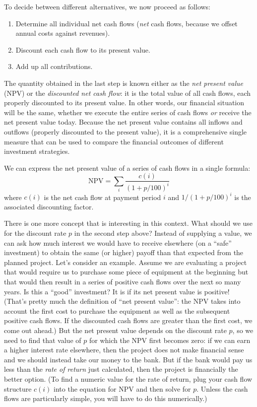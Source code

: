 To decide between different alternatives, we now proceed as follows:

\begin{enumerate}
\item Determine all individual net cash flows (\emph{net} cash flows, 
  because we offset annual costs against revenues).
\item Discount each cash flow to its present value.
\item Add up all contributions.
\end{enumerate}
 
The quantity obtained in the last step is known either as the
\emph{net present value} (NPV) or the \emph{discounted net cash flow}:
it is the total value of all cash flows, each properly discounted to
its present value. In other words, our financial situation will be the
same, whether we execute the entire series of cash flows \emph{or}
receive the net present value today.  Because the net present value
contains all inflows and outflows (properly discounted to the present
value), it is a comprehensive single measure that can be used to
compare the financial outcomes of different investment strategies.

We can express the net present value of a series of cash flows in a
single formula:
%
\[
\text{NPV} = \sum_i \frac{c(i)}{(1+p/100)^i}
\]
%
where $c(i)$ is the net cash flow at payment period $i$ and
$1/(1+p/100)^i$ is the associated discounting factor.


There is one more concept that is interesting in this context. What
should we use for the discount rate $p$ in the second step above?
Instead of supplying a value, we can ask how much interest we would
have to receive elsewhere (on a ``safe'' investment) to obtain the
same (or higher) payoff than that expected from the planned project.
Let's consider an example. Assume we are evaluating a project that
would require us to purchase some piece of equipment at the beginning
but that would then result in a series of positive cash flows over the
next so many years.  Is this a ``good'' investment? It is if its net
present value is positive! (That's pretty much the definition of ``net
present value'': the NPV takes into account the first cost to purchase
the equipment as well as the subsequent positive cash flows. If the
discounted cash flows are greater than the first cost, we come out
ahead.) But the net present value depends on the discount rate $p$, so
we need to find that value of $p$ for which the NPV first becomes
zero: if we can earn a higher interest rate elsewhere, then the
project does not make financial sense and we should instead take our
money to the bank. But if the bank would pay us less than the
\emph{rate of return} just calculated, then the project is financially
the better option. (To find a numeric value for the rate of return,
plug your cash flow structure $c(i)$ into the equation for NPV and
then solve for $p$. Unless the cash flows are particularly simple, you
will have to do this numerically.)

